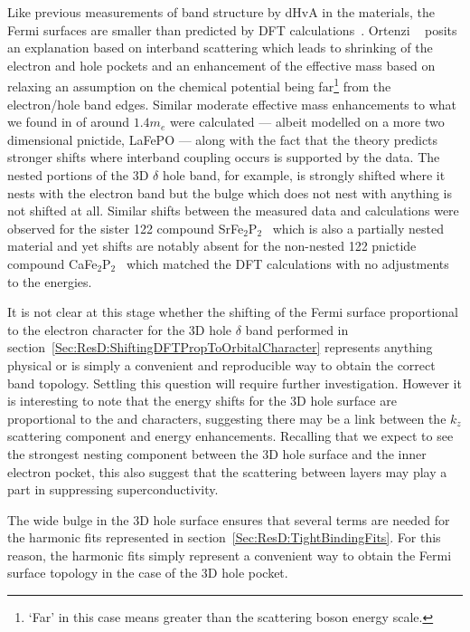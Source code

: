 Like previous measurements of band structure by \ac{dHvA} in the \BaFeAsP{} materials, the Fermi surfaces are smaller than predicted by \ac{DFT} calculations~\cite{Shishido2010, Analytis2010c}. Ortenzi \etal~\cite{Ortenzi2009} posits an explanation based on interband scattering which leads to shrinking of the electron and hole pockets and an enhancement of the effective mass based on relaxing an assumption on the chemical potential being far\footnote{`Far' in this case means greater than the scattering boson energy scale.} from the electron/hole band edges. Similar moderate effective mass enhancements to what we found in \BaFeP{} of around $1.4m_e$ were calculated --- albeit modelled on a more two dimensional pnictide, LaFePO --- along with the fact that the theory predicts stronger shifts where interband coupling occurs is supported by the \BaFeP{} data. The nested portions of the 3D $\delta$ hole band, for example, is strongly shifted where it nests with the electron band but the bulge which does not nest with anything is not shifted at all. Similar shifts between the measured data and calculations were observed for the sister 122 compound SrFe$_2$P$_2$~\cite{Analytis2009} which is also a partially nested material and yet shifts are notably absent for the non-nested 122 pnictide compound CaFe$_2$P$_2$~\cite{Coldea2009} which matched the \ac{DFT} calculations with no adjustments to the energies. 


It is not clear at this stage whether the shifting of the Fermi surface proportional to the electron character for the 3D hole $\delta$ band performed in section~\ref{Sec:ResD:ShiftingDFTPropToOrbitalCharacter} represents anything physical or is simply a convenient and reproducible way to obtain the correct band topology. Settling this question will require further investigation. However it is interesting to note that the energy shifts for the 3D hole surface are proportional to the \DzTwo{} and \DxzDyz{} characters, suggesting there may be a link between the $k_z$ scattering component and energy enhancements. Recalling that we expect to see the strongest nesting component between the 3D hole surface and the inner electron pocket, this also suggest that the scattering between layers may play a part in suppressing superconductivity.

The wide bulge in the 3D hole surface ensures that several terms are needed for the harmonic fits represented in section~\ref{Sec:ResD:TightBindingFits}. For this reason, the harmonic fits simply represent a convenient way to obtain the Fermi surface topology in the case of the 3D hole pocket.
